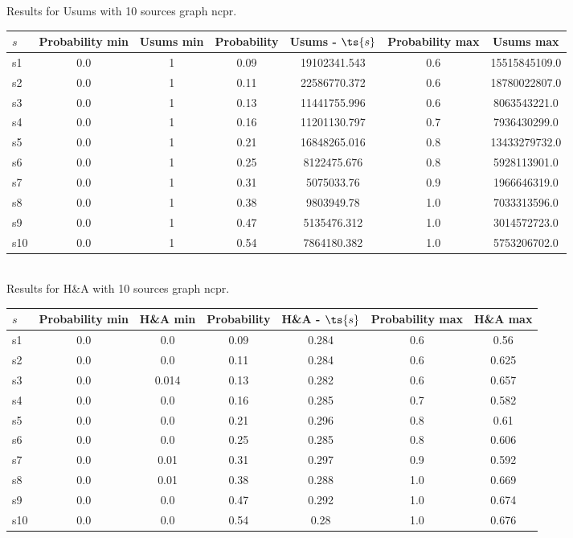 \documentclass{article}
\begin{document}
\noindent Results for Usums with 10 sources graph ncpr.

\noindent\begin{tabular}{|l|c|c|c|c|c|c|}
\hline
$s$& Probability min & Usums min & Probability & Usums - $\ts{s}$ & Probability max & Usums max\\
\hline
s1 &0.0 & 1 & 0.09 & 19102341.543 & 0.6 & 15515845109.0\\
\hline
s2 &0.0 & 1 & 0.11 & 22586770.372 & 0.6 & 18780022807.0\\
\hline
s3 &0.0 & 1 & 0.13 & 11441755.996 & 0.6 & 8063543221.0\\
\hline
s4 &0.0 & 1 & 0.16 & 11201130.797 & 0.7 & 7936430299.0\\
\hline
s5 &0.0 & 1 & 0.21 & 16848265.016 & 0.8 & 13433279732.0\\
\hline
s6 &0.0 & 1 & 0.25 & 8122475.676 & 0.8 & 5928113901.0\\
\hline
s7 &0.0 & 1 & 0.31 & 5075033.76 & 0.9 & 1966646319.0\\
\hline
s8 &0.0 & 1 & 0.38 & 9803949.78 & 1.0 & 7033313596.0\\
\hline
s9 &0.0 & 1 & 0.47 & 5135476.312 & 1.0 & 3014572723.0\\
\hline
s10 &0.0 & 1 & 0.54 & 7864180.382 & 1.0 & 5753206702.0\\
\hline
\end{tabular}\\

\noindent Results for H\&A with 10 sources graph ncpr.

\noindent\begin{tabular}{|l|c|c|c|c|c|c|}
\hline
$s$& Probability min & H\&A min & Probability & H\&A - $\ts{s}$ & Probability max & H\&A max\\
\hline
s1 &0.0 & 0.0 & 0.09 & 0.284 & 0.6 & 0.56\\
\hline
s2 &0.0 & 0.0 & 0.11 & 0.284 & 0.6 & 0.625\\
\hline
s3 &0.0 & 0.014 & 0.13 & 0.282 & 0.6 & 0.657\\
\hline
s4 &0.0 & 0.0 & 0.16 & 0.285 & 0.7 & 0.582\\
\hline
s5 &0.0 & 0.0 & 0.21 & 0.296 & 0.8 & 0.61\\
\hline
s6 &0.0 & 0.0 & 0.25 & 0.285 & 0.8 & 0.606\\
\hline
s7 &0.0 & 0.01 & 0.31 & 0.297 & 0.9 & 0.592\\
\hline
s8 &0.0 & 0.01 & 0.38 & 0.288 & 1.0 & 0.669\\
\hline
s9 &0.0 & 0.0 & 0.47 & 0.292 & 1.0 & 0.674\\
\hline
s10 &0.0 & 0.0 & 0.54 & 0.28 & 1.0 & 0.676\\
\hline
\end{tabular}\\
\end{document}
